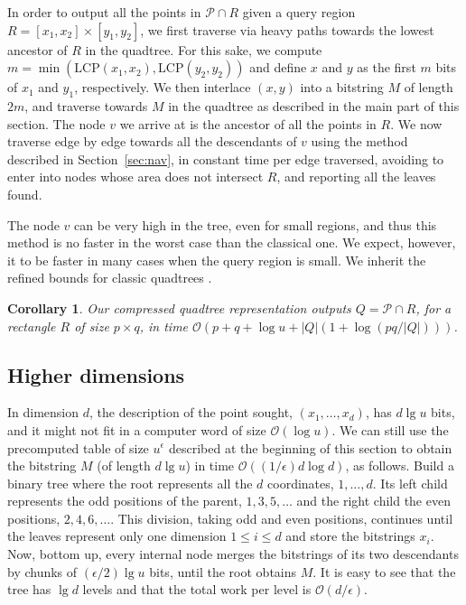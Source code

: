 \documentclass{elsarticle}
\newtheorem{corollary}[theorem]{Corollary}
\newcommand{\Oh}[1]
  {\ensuremath{\mathcal{O}\!\left( {#1} \right)}}
\newcommand{\LCP}{\ensuremath{\mathrm{LCP}}}
\begin{document}
In order to output all the points in $\mathcal{P} \cap R$ given a query region $R = [x_1,x_2] \times [y_1,y_2]$, we first traverse via heavy paths towards the lowest ancestor of $R$ in the quadtree. For this sake, we compute $m = \min(\LCP(x_1,x_2),\LCP(y_2,y_2))$ and define $x$ and $y$ as the first $m$ bits of $x_1$ and $y_1$, respectively. We then interlace $(x,y)$ into a bitstring $M$ of length $2m$, and traverse towards $M$ in the quadtree as described in the main part of this section. The node $v$ we arrive at is the ancestor of all the points in $R$. We now traverse edge by edge towards all the descendants of $v$ using the method described in Section~\ref{sec:nav}, in constant time per edge traversed, avoiding to enter into nodes whose area does not intersect $R$, and reporting all the leaves found.

The node $v$ can be very high in the tree, even for small regions, and thus this method is no faster in the worst case than the classical one. We expect, however, it to be faster in many cases when the query region is small. We inherit the
refined bounds for classic quadtrees \cite[p.~361]{Nav16}.

\begin{corollary}
Our compressed quadtree representation outputs $Q = \mathcal{P}\cap R$, for a rectangle $R$ of size $p \times q$, in time $\Oh{p+q+\log u+|Q|(1+\log(pq/|Q|))}$.
\end{corollary}

\subsection{Higher dimensions}

In dimension $d$, the description of the point sought, $(x_1,\ldots,x_d)$, has $d\lg u$ bits, and it might not fit in a computer word of size $\Oh{\log u}$. We can still use the precomputed table of size $u^\epsilon$ described at the beginning of this section to obtain the bitstring $M$ (of length $d\lg u$) in time $\Oh{(1/\epsilon)d\log d}$, as follows. Build a binary tree where the root represents all the $d$ coordinates, $1,\ldots,d$. Its left child represents the odd positions of the parent, $1,3,5,\ldots$ and the right child the even positions, $2,4,6,\ldots$. This division, taking odd and even positions, continues until the leaves represent only one dimension $1 \le i \le d$ and store the bitstrings $x_i$. Now, bottom up, every internal node merges the bitstrings of its two descendants by chunks of $(\epsilon/2)\lg u$ bits,  until the root obtains $M$. It is easy to see that the tree has $\lg d$ levels and that the total work per level is $\Oh{d/\epsilon}$.
\end{document}
